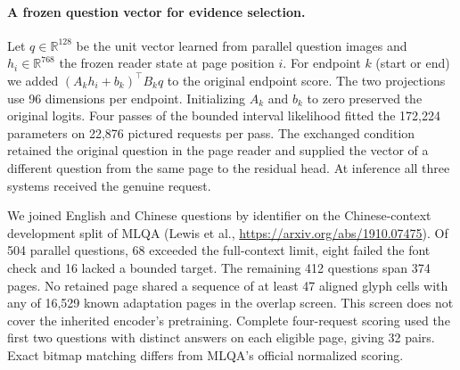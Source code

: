 \paragraph{A frozen question vector for evidence selection.}
Let $q\in\mathbb{R}^{128}$ be the unit vector learned from parallel question images and $h_i\in\mathbb{R}^{768}$ the frozen reader state at page position $i$. For endpoint $k$ (start or end) we added $(A_k h_i+b_k)^\top B_k q$ to the original endpoint score. The two projections use 96 dimensions per endpoint. Initializing $A_k$ and $b_k$ to zero preserved the original logits. Four passes of the bounded interval likelihood fitted the 172,224 parameters on 22,876 pictured requests per pass. The exchanged condition retained the original question in the page reader and supplied the vector of a different question from the same page to the residual head. At inference all three systems received the genuine request.

We joined English and Chinese questions by identifier on the Chinese-context development split of MLQA (Lewis et al., \url{https://arxiv.org/abs/1910.07475}). Of 504 parallel questions, 68 exceeded the full-context limit, eight failed the font check and 16 lacked a bounded target. The remaining 412 questions span 374 pages. No retained page shared a sequence of at least 47 aligned glyph cells with any of 16,529 known adaptation pages in the overlap screen. This screen does not cover the inherited encoder's pretraining. Complete four-request scoring used the first two questions with distinct answers on each eligible page, giving 32 pairs. Exact bitmap matching differs from MLQA's official normalized scoring.
